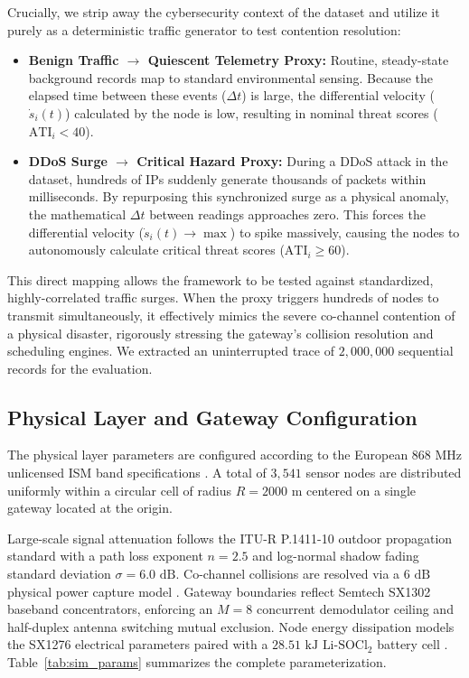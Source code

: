 \documentclass[preprint,review,12pt]{elsarticle}
\begin{document}
Crucially, we strip away the cybersecurity context of the dataset and utilize it purely as a deterministic traffic generator to test contention resolution:

\begin{itemize}

    \item \textbf{Benign Traffic $\to$ Quiescent Telemetry Proxy:} Routine, steady-state background records map to standard environmental sensing. Because the elapsed time between these events ($\Delta t$) is large, the differential velocity ($\dot{s}_i(t)$) calculated by the node is low, resulting in nominal threat scores ($\text{ATI}_i < 40$).

    \item \textbf{DDoS Surge $\to$ Critical Hazard Proxy:} During a DDoS attack in the dataset, hundreds of IPs suddenly generate thousands of packets within milliseconds. By repurposing this synchronized surge as a physical anomaly, the mathematical $\Delta t$ between readings approaches zero. This forces the differential velocity ($\dot{s}_i(t) \to \max$) to spike massively, causing the nodes to autonomously calculate critical threat scores ($\text{ATI}_i \ge 60$). 

\end{itemize}

This direct mapping allows the framework to be tested against standardized, highly-correlated traffic surges. When the proxy triggers hundreds of nodes to transmit simultaneously, it effectively mimics the severe co-channel contention of a physical disaster, rigorously stressing the gateway's collision resolution and scheduling engines. We extracted an uninterrupted trace of $2,000,000$ sequential records for the evaluation.

\subsection{Physical Layer and Gateway Configuration}

The physical layer parameters are configured according to the European $868\text{ MHz}$ unlicensed ISM band specifications \cite{semtech2020sx1276}. A total of $3,541$ sensor nodes are distributed uniformly within a circular cell of radius $R = 2000\text{ m}$ centered on a single gateway located at the origin.

Large-scale signal attenuation follows the ITU-R P.1411-10 outdoor propagation standard \cite{itur2019p1411} with a path loss exponent $n = 2.5$ and log-normal shadow fading standard deviation $\sigma = 6.0\text{ dB}$. Co-channel collisions are resolved via a $6\text{ dB}$ physical power capture model \cite{bankov2017mathematical}. Gateway boundaries reflect Semtech SX1302 baseband concentrators, enforcing an $M = 8$ concurrent demodulator ceiling and half-duplex antenna switching mutual exclusion. Node energy dissipation models the SX1276 electrical parameters paired with a $28.51\text{ kJ}$ $\text{Li-SOCl}_2$ battery cell \cite{bouguera2018energy}. Table~\ref{tab:sim_params} summarizes the complete parameterization.
\end{document}
